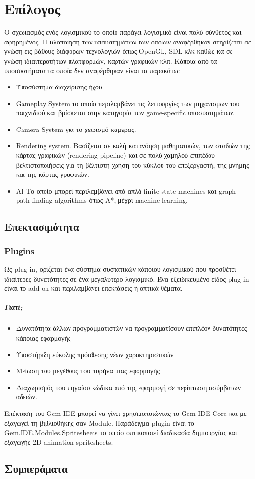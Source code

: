 \chapter{Επίλoγος}
Ο σχεδιασμός ενός λογισμικού το οποίο παράγει λογισμικό είναι πολύ σύνθετος και αφηρημένος. Η υλοποίηση των υπσυστημάτων των οποίων αναφέρθηκαν στηρίζεται σε γνώση εις βάθους διάφορων τεχνολογιών όπως OpenGL, SDL κλκ καθώς κα σε γνώση ιδιαιτεροτήτων πλατφορμών, καρτών γραφικών κλπ. Κάποια από τα υποσυστήματα τα οποία δεν αναφέρθηκαν είναι τα παρακάτω:
\begin{itemize}
	\item Υποσύστημα διαχείρισης ήχου
	\item Gameplay System το οποίο περιλαμβάνει τις λειτουργίες των μηχανισμων του παιχνιδιού και βρίσκεται στην κατηγορία των game-specific υποσυστημάτων.
	\item Camera System για το χειρισμό κάμερας. 
	\item Rendering system. Βασίζεται σε καλή κατανόηση μαθηματικών, των σταδιών της κάρτας γραφικών (rendering pipeline) και σε πολύ χαμηλού επιπέδου βελτιστοποιήσεις για τη βέλτιστη χρήση του κύκλου του επεξεργαστή, της μνήμης και της κάρτας γραφικών.
	\item AI Το οποίο μπορεί περιλαμβάνει από απλά finite state machines και graph path finding algorithms όπως Α*, μέχρι machine learning. 
	
\end{itemize}
\section{Επεκτασιμότητα}	
	\subsection{Plugins}
	Ως plug-in, ορίζεται ένα σύστημα συστατικών κάποιου λογισμικού που προσθέτει ιδιαίτερες δυνατότητες σε ένα μεγαλύτερο λογισμικό. Ένα εξειδικευμένο είδος plug-in είναι το add-on και περιλαμβάνει επεκτάσεις ή οπτικά θέματα.	
	\paragraph{Γιατί;}
	\begin{itemize}
		\item Δυνατότητα άλλων προγραμματιστών να προγραμματίσουν επιπλέον δυνατότητες κάποιας εφαρμογής
		\item Υποστήριξη εύκολης πρόσθεσης νέων χαρακτηριστικών
		\item Μείωση του μεγέθους του πυρήνα μιας εφαρμογής
		\item Διαχωρισμός του πηγαίου κώδικα από της εφαρμογή σε περίπτωση ασύμβατων αδειών.
	\end{itemize}
	Επέκταση του Gem IDE μπορεί να γίνει χρησιμοποιώντας το Gem IDE Core και με εξαγωγεί τη βιβλιοθήκης σαν Module. Παράδειγμα plugin είναι το Gem.IDE.Modules.Spritesheets το οποίο οπτικοποιεί διαδικασία δημιουργίας και εξαγωγής 2D animation spritesheets.
	
\section{Συμπεράματα}

